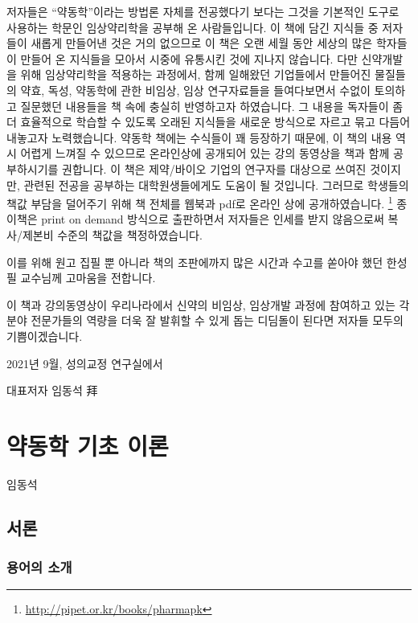 \documentclass[
  11pt,
  krantz2, a4paper, twoside]{krantz}
\theoremstyle{definition}
\theoremstyle{definition}
\theoremstyle{definition}
\theoremstyle{definition}
\theoremstyle{remark}
\begin{document}
저자들은 ``약동학''이라는 방법론 자체를 전공했다기 보다는 그것을 기본적인
도구로 사용하는 학문인 임상약리학을 공부해 온 사람들입니다. 이 책에 담긴
지식들 중 저자들이 새롭게 만들어낸 것은 거의 없으므로 이 책은 오랜 세월
동안 세상의 많은 학자들이 만들어 온 지식들을 모아서 시중에 유통시킨 것에
지나지 않습니다. 다만 신약개발을 위해 임상약리학을 적용하는 과정에서,
함께 일해왔던 기업들에서 만들어진 물질들의 약효, 독성, 약동학에 관한
비임상, 임상 연구자료들을 들여다보면서 수없이 토의하고 질문했던 내용들을
책 속에 충실히 반영하고자 하였습니다. 그 내용을 독자들이 좀 더
효율적으로 학습할 수 있도록 오래된 지식들을 새로운 방식으로 자르고 묶고
다듬어 내놓고자 노력했습니다. 약동학 책에는 수식들이 꽤 등장하기 때문에, 이 책의 내용 역시 어렵게 느껴질 수 있으므로 온라인상에 공개되어 있는 강의 동영상을 책과 함께 공부하시기를 권합니다.
이 책은 제약/바이오 기업의 연구자를 대상으로 쓰여진 것이지만, 관련된 전공을 공부하는 대학원생들에게도 도움이 될 것입니다.
그러므로 학생들의 책값 부담을 덜어주기 위해 책 전체를 웹북과 pdf로 온라인 상에 공개하였습니다. \footnote{\url{http://pipet.or.kr/books/pharmapk}}
종이책은 print on demand 방식으로 출판하면서 저자들은 인세를 받지 않음으로써 복사/제본비 수준의 책값을 책정하였습니다.

이를 위해 원고 집필 뿐 아니라 책의 조판에까지 많은 시간과 수고를 쏟아야 했던 한성필 교수님께 고마움을 전합니다.

이 책과 강의동영상이 우리나라에서 신약의 비임상, 임상개발 과정에 참여하고 있는 각 분야 전문가들의 역량을 더욱 잘 발휘할 수 있게 돕는 디딤돌이 된다면 저자들 모두의 기쁨이겠습니다.

\hfill 2021년 9월, 성의교정 연구실에서

\hfill 대표저자 임동석 拜

\normalsize

\mainmatter

\chapter{약동학 기초 이론}\label{principle}

\Large\hfill

임동석
\normalsize

\section{서론}\label{uxc11cuxb860}

\subsection{용어의 소개}\label{uxc6a9uxc5b4uxc758-uxc18cuxac1c}
\end{document}
